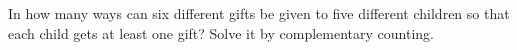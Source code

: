 In how many ways can six different gifts be given to five different children so that each child gets at least one gift? Solve it by complementary counting.
